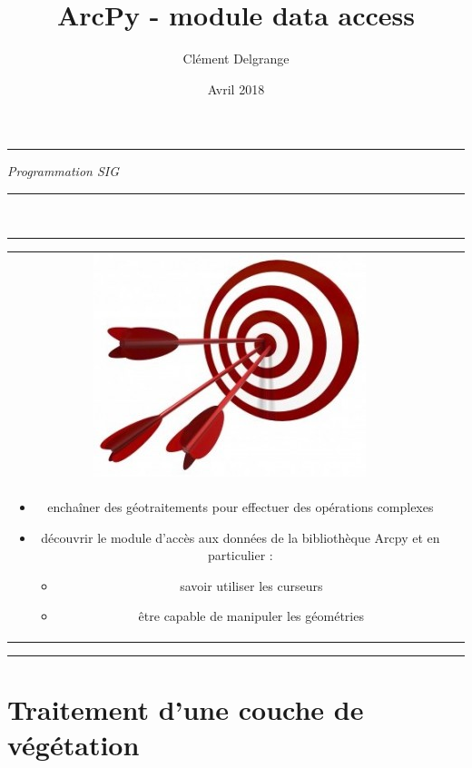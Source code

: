 \documentclass[11pt]{article}
\title{ArcPy - module data access}
\author{Clément Delgrange}
\date{Avril 2018}
\newenvironment{objectifs}{
  \hrule
	\begin{minipage}{0.9\textwidth}
		\vspace{1em}
		\begin{tabular}[t t]{c c}
			\includegraphics[width=0.1\linewidth]{img/goals.jpg} &
			\begin{minipage}[c]{0.8\linewidth}
				\hspace{2em}\textbf{\large{Objectifs :}} \\
}{
			\end{minipage}
		\end{tabular}
		\vspace{1em}
	\end{minipage}
	\hrule
}
\begin{document}
\parindent=0cm


\begin{titlepage}
\makeatletter
	\begin{sffamily}
		\begin{flushleft}
		\end{flushleft}
		\begin{flushright}
		\end{flushright}

		\vspace{4cm}

		\begin{center}
			\hrule
				\vspace{1em}
				{\small \textit{Programmation SIG}}\\
				\vspace{0.5cm}
				{\huge\bfseries \@title}
				\vspace{1cm}
			\hrule

			\vspace{3.5cm}
			\vspace{5cm}

			\large \textit{\@author}\\
			\small \textit{\@date}
		\end{center}
	\end{sffamily}
\makeatother
\end{titlepage}


\begin{objectifs}
\begin{itemize}
	\item enchaîner des géotraitements pour effectuer des opérations complexes
	\item découvrir le module d'accès aux données de la bibliothèque Arcpy et en particulier :
	\begin{itemize}
	\item savoir utiliser les curseurs
	\item être capable de manipuler les géométries
	\end{itemize}
\end{itemize}
\end{objectifs}



\section{Traitement d'une couche de végétation}
\end{document}
